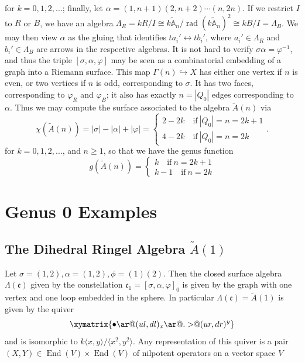 \documentclass[11pt,oneside]{amsbook}
\numberwithin{equation}{section}
\theoremstyle{plain}
\theoremstyle{definition}
\theoremstyle{remark}
\DeclareMathOperator{\rad}{\mathrm{rad}}
\DeclareMathOperator{\rank}{\mathrm{rank}}
\DeclareMathOperator{\End}{\mathrm{End}}
\DeclareMathOperator{\SL}{\mathrm{SL}}
\newcommand{\la}{\langle}
\newcommand{\ra}{\rangle}
\begin{document}
	for $k=0,1,2,...$; finally, let $\alpha = (1,n+1)(2,n+2) \cdots (n,2n)$. If we restrict $I$ to $R$ or $B$, we have an algebra $\Lambda_R = kR/I \cong k \mathbb{\tilde{A}}_n/\rad(k \mathbb{\tilde{A}}_n)^2 \cong kB/I = \Lambda_B$. We may then view $\alpha$ as the gluing that identifies $ta_i' \leftrightarrow tb_i'$, where $a_i' \in \Lambda_R$ and $b_i' \in \Lambda_B$ are arrows in the respective algebras. It is not hard to verify $\sigma \alpha = \varphi^{-1}$, and thus the triple $[\sigma, \alpha, \varphi]$ may be seen as a combinatorial embedding of a graph into a Riemann surface. This map $\Gamma(n) \hookrightarrow X$ has either one vertex if $n$ is even, or two vertices if $n$ is odd, corresponding to $\sigma$. It has two faces, corresponding to $\varphi_R$ and $\varphi_B$; it also has exactly $n=|Q_0|$ edges corresponding to $\alpha$. Thus we may compute the surface associated to the algebra $\tilde{A}(n)$ via
	\[ \chi(\tilde{A}(n)) = |\sigma|-|\alpha|+|\varphi| = \begin{cases}
		2-2k \quad \text{if} \ |Q_0|=n=2k+1 \\
		4-2k \quad \text{if} \ |Q_0| = n = 2k
	\end{cases}. \]
	for $k=0,1,2,...$, and $n \geq 1$, so that we have the genus function 
	\[ g(\tilde{A}(n)) = \begin{cases}
		k \quad \text{if} \ n=2k+1 \\
		k-1 \quad \text{if} \ n=2k
	\end{cases} \]
	
	
	\section{Genus 0 Examples}
	\subsection{The Dihedral Ringel Algebra $\tilde{A}(1)$}
	Let $\sigma = (1,2), \alpha = (1,2), \phi = (1)(2)$. Then the closed surface algebra $\Lambda(\mathfrak{c})$ given by the constellation $\mathfrak{c}_1 = [\sigma, \alpha, \varphi]_0$ is given by the graph with one vertex and one loop embedded in the sphere. In particular $\Lambda(\mathfrak{c}) = \tilde{A}(1)$ is given by the quiver
	\[ \xymatrix{\bullet \ar@(ul,dl)_x \ar@{.>}@(ur,dr)^y} \]
	and is isomorphic to $k\la x,y \ra / \la x^2, y^2 \ra$. Any representation of this quiver is a pair $(X,Y) \in \End(V) 
	\times \End(V)$ of nilpotent operators on a vector space $V$ 
		
\end{document}
